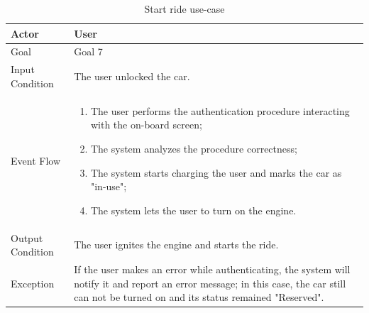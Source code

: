 \begin{table}[H]
\begin{center}
\begin{tabular}{p{} | p{}}
\hline
Actor & User\\
\hline
Goal & Goal 7\\
\hline
Input Condition & The user unlocked the car.\\
\hline
Event Flow & 
\begin{enumerate}
\item The user performs the authentication procedure interacting with the on-board screen;
\item The system analyzes the procedure correctness;
\item The system starts charging the user and marks the car as "in-use";
\item The system lets the user to turn on the engine.
\end{enumerate} \\
\hline
Output Condition & The user ignites the engine and starts the ride.\\
\hline
Exception & If the user makes an error while authenticating, the system will notify it and report an error message; in this case, the car still can not be turned on and its status remained "Reserved".\\
\hline
\end{tabular}
\end{center}
\caption{Start ride use-case}
\label{start_ride_uc}
\end{table}